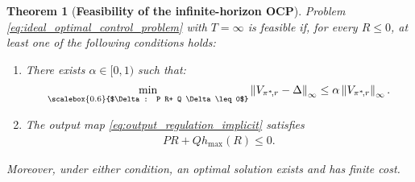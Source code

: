 \documentclass[10pt,leqno]{amsart}
\newcommand{\sml}{\scriptscriptstyle}
\newcommand{\norm}[1]{\left \|#1 \right \|}
\newcommand{\cost}{r}
\newcommand{\Vsym}{V}
\newcommand{\Varg}[1]{\Vsym_{#1}}
\newcommand{\Cost}{R}
\newcommand{\policy}{\pi}
\newcommand{\infnorm}[1]{\norm{#1}_\infty}
\newcommand{\outmap}{h_{\sml \text{max}}}
\newtheorem{theorem}{Theorem}[]
\begin{document}
\begin{theorem}[\textbf{Feasibility of the infinite-horizon OCP}]\label{th:sufficient_conditions_feasibility}
    Problem \eqref{eq:ideal_optimal_control_problem} with $T = \infty$ is feasible if, for every $\Cost \leq 0$, at least one of the following conditions holds:
    \begin{enumerate}[label= (\alph*), ref=\thetheorem-(\alph*)]
        \item\label{prop:sufficient_condition_feasibility_1} There exists $\alpha \in [0, 1)$ such that:
        \begin{align}
            \min_{\scalebox{0.6}{$\Delta : P \Cost + Q \Delta \leq 0$}} \infnorm{\Varg{\policy^*\!, \cost} - \Delta } \leq \alpha \infnorm{\Varg{\policy^*\!, \cost}}.
        \end{align}
        \item\label{prop:sufficient_condition_feasibility_2} The output map \eqref{eq:output_regulation_implicit} satisfies
        \begin{align}\label{eq:feasibility_of_output_feedback}
            P \Cost + Q \outmap(\Cost) \leq 0.
        \end{align}
    \end{enumerate}
    Moreover, under either condition, an optimal solution exists and has finite cost.
\end{theorem}
\end{document}
